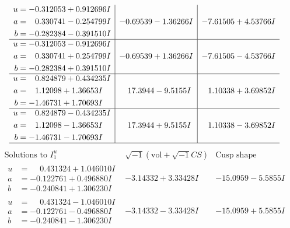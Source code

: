 \documentclass[1p]{elsarticle_modified}
\theoremstyle{definition}
\newcommand{\I}{\sqrt{-1}}
\begin{document}
$$\begin{array}{c|c|c}
\begin{aligned}
u &= -0.312053 + 0.912696 I \\
a &= \phantom{-}0.330741 - 0.254799 I \\
b &= -0.282384 - 0.391510 I\end{aligned}
 & -0.69539 - 1.36266 I & -7.61505 + 4.53766 I \\ \hline\begin{aligned}
u &= -0.312053 - 0.912696 I \\
a &= \phantom{-}0.330741 + 0.254799 I \\
b &= -0.282384 + 0.391510 I\end{aligned}
 & -0.69539 + 1.36266 I & -7.61505 - 4.53766 I \\ \hline\begin{aligned}
u &= \phantom{-}0.824879 + 0.434235 I \\
a &= \phantom{-}1.12098 + 1.36653 I \\
b &= -1.46731 + 1.70693 I\end{aligned}
 & \phantom{-}17.3944 - 9.5155 I & \phantom{-}1.10338 + 3.69852 I \\ \hline\begin{aligned}
u &= \phantom{-}0.824879 - 0.434235 I \\
a &= \phantom{-}1.12098 - 1.36653 I \\
b &= -1.46731 - 1.70693 I\end{aligned}
 & \phantom{-}17.3944 + 9.5155 I & \phantom{-}1.10338 - 3.69852 I\\
 \hline 
 \end{array}$$\newpage$$\begin{array}{c|c|c}  
\text{Solutions to }I^u_{1}& \I (\text{vol} + \sqrt{-1}CS) & \text{Cusp shape}\\
 \hline 
\begin{aligned}
u &= \phantom{-}0.431324 + 1.046010 I \\
a &= -0.122761 + 0.496880 I \\
b &= -0.240841 + 1.306230 I\end{aligned}
 & -3.14332 + 3.33428 I & -15.0959 - 5.5855 I \\ \hline\begin{aligned}
u &= \phantom{-}0.431324 - 1.046010 I \\
a &= -0.122761 - 0.496880 I \\
b &= -0.240841 - 1.306230 I\end{aligned}
 & -3.14332 - 3.33428 I & -15.0959 + 5.5855 I \\ \hline\begin{aligned}

\end{aligned}
\end{array}$$
\end{document}
